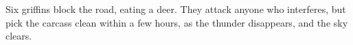 

Six \glspl{griffin} block the road, eating a deer.
They attack anyone who interferes, but pick the carcass clean within a few hours, as the thunder disappears, and the sky clears.

